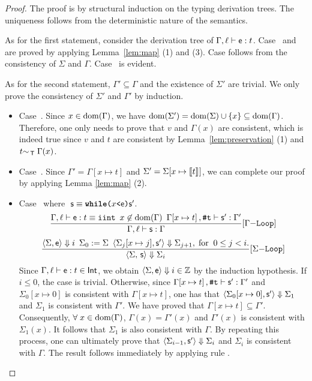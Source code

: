 \documentclass[runningheads]{llncs}
\begin{document}
\begin{proof}
The proof is by structural induction on the typing derivation trees.
The uniqueness follows from the deterministic nature of the semantics.

As for the first statement, consider the derivation tree of $\Gamma,\ell\vdash\mathsf{e}:t$.
Case~ and  are proved by applying Lemma~\ref{lem:map} (1) and (3).
Case  follows from the consistency of $\Sigma$ and $\Gamma$.
Case~ is evident.

As for the second statement, $\Gamma'\subseteq\Gamma$ and the existence of $\Sigma'$ are trivial.
We only prove the consistency of $\Sigma'$ and $\Gamma'$ by induction.
\begin{itemize}
    \item Case~.
    Since $x\in\mathrm{dom}(\Gamma)$, we have $\mathrm{dom}(\Sigma')=\mathrm{dom}(\Sigma)\cup\{x\}\subseteq\mathrm{dom}(\Gamma)$.
    Therefore, one only needs to prove that $v$ and $\Gamma(x)$ are consistent, which is indeed true since $v$ and $t$ are consistent by Lemma~\ref{lem:preservation} (1) and $t{\sim_{\,\mathsf{T}}\;}\Gamma(x)$.
    \item Case~.
    Since $\Gamma'=\Gamma[x\mapsto t]$ and $\Sigma'=\Sigma[x\mapsto\llbracket t\rrbracket_{}]$, we can complete our proof by applying Lemma \ref{lem:map} (2).
    \item Case~ where $\;\mathsf{s}\equiv\texttt{\textbf{while}(}x \texttt{<} \mathsf{e} \texttt{)} \mathsf{s}'$.
    $$\frac{\Gamma,\ell\vdash\mathsf{e}:t\equiv\mathtt{iint}\enspace x\not\in\mathrm{dom}(\Gamma)\enspace\Gamma[x\mapsto{t}]\,,\texttt{\#}\mathtt{t}\vdash\mathsf{s}':\Gamma'}{\Gamma,\ell\vdash\mathsf{s}:\Gamma}[\Gamma\mathtt{-Loop}]$$
    \[\frac{\langle\Sigma,\mathsf{e}\rangle\Downarrow{i}\enspace\Sigma_0:=\Sigma\enspace\langle\Sigma_{j}[x\mapsto j],\mathsf{s}'\rangle\Downarrow{\Sigma_{j+1}},\;\text{for}\;\;0\le j< i.}{\langle\Sigma,\,\mathsf{s}\rangle\Downarrow{\Sigma_{i}}}[\Sigma\mathtt{-Loop}]\]
    Since $\Gamma,\ell\vdash\mathsf{e}:t \in \mathsf{Int}$, we obtain $\langle\Sigma,\mathsf{e}\rangle\Downarrow{i \in \mathbb{Z}}$ by the induction hypothesis.
    If $i\le 0$, the case is trivial.
    Otherwise, since $\Gamma[x\mapsto t]\,,\texttt{\#}\mathtt{t}\vdash\mathsf{s}':\Gamma'$ and $\Sigma_0[x\mapsto 0]$ is consistent with $\Gamma[x\mapsto t]$, one has that $\langle\Sigma_0[x\mapsto 0],\mathsf{s}'\rangle\Downarrow{\Sigma_1}$ and $\Sigma_1$ is consistent with $\Gamma'$.
    We have proved that $\Gamma[x\mapsto{t}]\subseteq\Gamma'$. Consequently, $\forall\; x\in\mathrm{dom}(\Gamma)$, $\Gamma(x)=\Gamma'(x)$ and $\Gamma'(x)$ is consistent with $\Sigma_1(x)$. It follows that $\Sigma_1$ is also consistent with $\Gamma$. By repeating this process, one can ultimately prove that $\langle\Sigma_{i-1},\mathsf{s}'\rangle\Downarrow{\Sigma_i}$ and $\Sigma_i$ is consistent with $\Gamma$. The result follows immediately by applying rule .

\end{itemize}
\end{proof}
\end{document}

